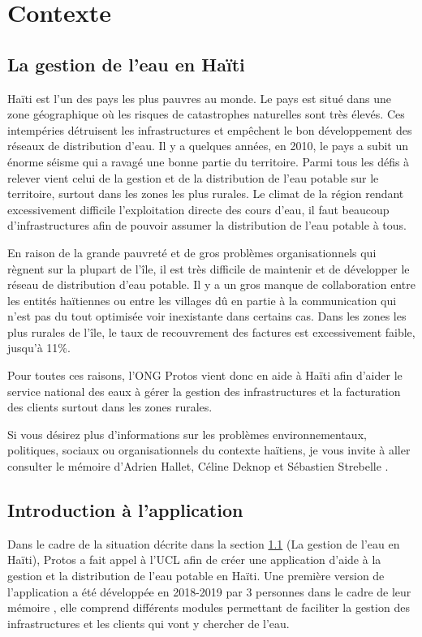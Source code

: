 \documentclass{EPL-master-thesis-covers-FR}
\begin{document}

	\chapter{Contexte}


		\section{La gestion de l'eau en Haïti}
			\label{sec:situation}
			
				Haïti est l'un des pays les plus pauvres au monde. Le pays est situé dans une zone géographique où les risques de catastrophes naturelles sont très élevés. Ces intempéries détruisent les infrastructures et empêchent le bon développement des réseaux de distribution d'eau. Il y a quelques années, en 2010, le pays a subit un énorme séisme qui a ravagé une bonne partie du territoire. Parmi tous les défis à relever vient celui de la gestion et de la distribution de l'eau potable sur le territoire, surtout dans les zones les plus rurales. Le climat de la région rendant excessivement difficile l'exploitation directe des cours d'eau, il faut beaucoup d'infrastructures afin de pouvoir assumer la distribution de l'eau potable à tous.
				
				En raison de la grande pauvreté et de gros problèmes organisationnels qui règnent sur la plupart de l'île, il est très difficile de maintenir et de développer le réseau de distribution d'eau potable. Il y a un gros manque de collaboration entre les entités haïtiennes ou entre les villages dû en partie à la communication qui n'est pas du tout optimisée voir inexistante dans certains cas. Dans les zones les plus rurales de l'île, le taux de recouvrement des factures est excessivement faible, jusqu'à 11\%.
				
				Pour toutes ces raisons, l'ONG Protos vient donc en aide à Haïti afin d'aider le service national des eaux à gérer la gestion des infrastructures et la facturation des clients surtout dans les zones rurales.
				
				Si vous désirez plus d'informations sur les problèmes environnementaux, politiques, sociaux ou organisationnels du contexte haïtiens, je vous invite à aller consulter le mémoire d'Adrien Hallet, Céline Deknop et Sébastien Strebelle \cite{ref:haitiwater}.



		\section{Introduction à l'application}
				Dans le cadre de la situation décrite dans la section \ref{sec:situation} (La gestion de l'eau en Haïti), Protos a fait appel à l'UCL afin de créer une application d'aide à la gestion et la distribution de l'eau potable en Haïti. Une première version de l'application a été développée en 2018-2019 par 3 personnes dans le cadre de leur mémoire \cite{ref:haitiwater}, elle comprend différents modules permettant de faciliter la gestion des infrastructures et les clients qui vont y chercher de l'eau.
				
\end{document}
